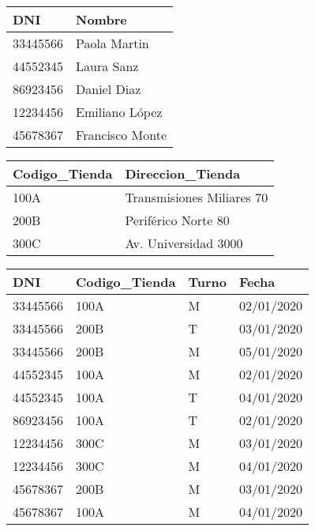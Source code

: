 \documentclass{article}
\begin{document}

\begin{tabular}{|p{0.6in}|p{0.6in}|} \hline 
\textbf{DNI} & \textbf{Nombre} \\ \hline 
33445566 & Paola Martin \\ \hline 
44552345 & Laura Sanz \\ \hline 
86923456 & Daniel Diaz \\ \hline 
12234456 & Emiliano L\'{o}pez \\ \hline 
45678367 & Francisco Monte \\ \hline 
\end{tabular}



\begin{tabular}{|p{1.0in}|p{1.1in}|} \hline 
\textbf{Codigo\_Tienda} & \textbf{Direccion\_Tienda} \\ \hline 
100A & Transmisiones Miliares 70 \\ \hline 
200B & Perif\'{e}rico Norte 80 \\ \hline 
300C & Av. Universidad 3000 \\ \hline 
\end{tabular}



\noindent 

\begin{tabular}{|p{0.5in}|p{0.9in}|p{0.4in}|p{0.5in}|} \hline 
\textbf{DNI} & \textbf{Codigo\_Tienda} & \textbf{Turno} & \textbf{Fecha} \\ \hline 
33445566 & 100A & M & 02/01/2020 \\ \hline 
33445566 & 200B & T & 03/01/2020 \\ \hline 
33445566 & 200B & M & 05/01/2020 \\ \hline 
44552345 & 100A & M & 02/01/2020 \\ \hline 
44552345 & 100A & T & 04/01/2020 \\ \hline 
86923456 & 100A & T & 02/01/2020 \\ \hline 
12234456 & 300C & M & 03/01/2020 \\ \hline 
12234456 & 300C & M & 04/01/2020 \\ \hline 
45678367 & 200B & M & 03/01/2020 \\ \hline 
45678367 & 100A & M & 04/01/2020 \\ \hline 
\end{tabular}



\noindent 
\end{document}
